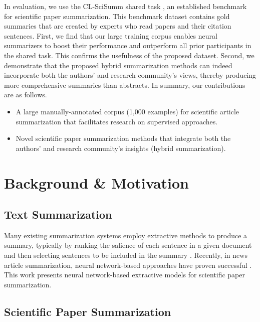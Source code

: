 \documentclass[letterpaper]{article} \usepackage{aaai19}  \usepackage{times}  \usepackage{helvet}  \usepackage{courier}  \usepackage{url}
\begin{document}
In evaluation, we use the CL-SciSumm shared task \cite{jaidka2016overview}, an established benchmark for scientific paper summarization.
This benchmark dataset contains gold summaries that are created by experts who read papers and their citation sentences.
First, we find that
our large training corpus enables neural summarizers to boost their performance and outperform all prior participants in the shared task. This confirms the usefulness of the proposed dataset.
Second, we demonstrate that the proposed hybrid summarization methods can indeed incorporate both the authors' and research community's views, thereby producing more comprehensive summaries than abstracts.
In summary, our contributions are as follows.
\vspace{-1mm}
\begin{itemize}
\setlength{\itemsep}{-0.5mm}
    \item A large manually-annotated corpus (1,000 examples) for scientific article summarization that facilitates research on supervised approaches.
    \item Novel scientific paper summarization methods that integrate both the authors' and research community's insights (hybrid summarization).\vspace{-1mm}
\end{itemize}




\section{Background \& Motivation}
\subsection{Text Summarization}
Many existing summarization systems employ extractive methods to produce a summary, typically by ranking the salience of each sentence in a given document and then selecting sentences to be included in the summary \cite{erkan2004lexrank,parveen-ramsl-strube:2015:EMNLP}.
Recently, in news article summarization, neural network-based approaches have proven successful \cite{cao2015ranking,cheng-lapata:2016:P16-1,nallapati2017summarunner,see2017get}.
This work presents neural network-based extractive models for scientific paper summarization.


\subsection{Scientific Paper Summarization}
\label{sec:motivation_scisumm}
\end{document}
